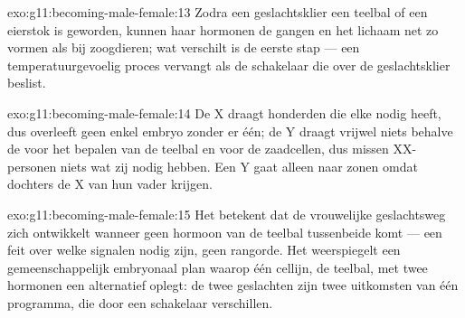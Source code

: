 \begin{solution}{exo:g11:becoming-male-female:13}
Zodra een geslachtsklier een teelbal of een eierstok is geworden, kunnen
haar hormonen de gangen en het lichaam net zo vormen als bij zoogdieren;
wat verschilt is de eerste stap --- een temperatuurgevoelig proces
vervangt  als de schakelaar die over de geslachtsklier beslist.
\end{solution}

\begin{solution}{exo:g11:becoming-male-female:14}
De X draagt honderden  die elke  nodig heeft, dus overleeft geen
enkel embryo zonder er één; de Y draagt vrijwel niets behalve de 
voor het bepalen van de teelbal en voor de zaadcellen, dus missen
XX-personen niets wat zij nodig hebben. Een Y gaat alleen naar zonen
omdat dochters de X van hun vader krijgen.
\end{solution}

\begin{solution}{exo:g11:becoming-male-female:15}
Het betekent dat de vrouwelijke geslachtsweg zich ontwikkelt wanneer geen
hormoon van de teelbal tussenbeide komt --- een feit over welke signalen
nodig zijn, geen rangorde. Het weerspiegelt een gemeenschappelijk
embryonaal plan waarop één cellijn, de teelbal, met twee hormonen een
alternatief oplegt: de twee geslachten zijn twee uitkomsten van één
programma, die door een schakelaar verschillen.
\end{solution}

